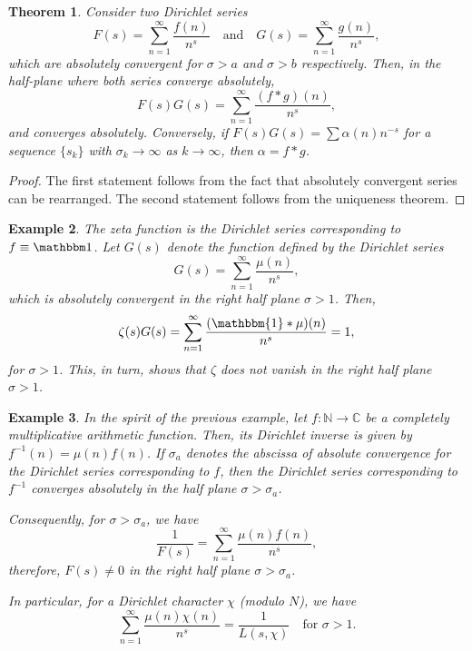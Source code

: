\documentclass[12pt]{article}
\theoremstyle{thmstyle}
\newtheorem{theorem}{Theorem}[section]
\theoremstyle{defstyle}
\newtheorem{example}[theorem]{Example}
\newcommand{\N}{\mathbb{N}}
\newcommand{\bbC}{\mathbb{C}}
\begin{document}
\begin{theorem}
    Consider two Dirichlet series 
    \begin{equation*}
        F(s) = \sum_{n = 1}^\infty\frac{f(n)}{n^s}\quad\text{and}\quad G(s) = \sum_{n = 1}^\infty\frac{g(n)}{n^s},
    \end{equation*}
    which are absolutely convergent for $\sigma > a$ and $\sigma > b$ respectively. Then, in the half-plane where both series converge absolutely, 
    \begin{equation*}
        F(s)G(s) = \sum_{n = 1}^\infty\frac{(f\ast g)(n)}{n^s},
    \end{equation*}
    and converges absolutely. Conversely, if $F(s)G(s) = \sum\alpha(n)n^{-s}$ for a sequence $\{s_k\}$ with $\sigma_k\to\infty$ as $k\to\infty$, then $\alpha = f\ast g$.
\end{theorem}
\begin{proof}
    The first statement follows from the fact that absolutely convergent series can be rearranged. The second statement follows from the uniqueness theorem.
\end{proof}

\begin{example}
    The zeta function is the Dirichlet series corresponding to $f\equiv\mathbbm 1$. Let $G(s)$ denote the function defined by the Dirichlet series 
    \begin{equation*}
        G(s) = \sum_{n = 1}^\infty\frac{\mu(n)}{n^s},
    \end{equation*}
    which is absolutely convergent in the right half plane $\sigma > 1$. Then, 
    \begin{equation*}
        \zeta(s)G(s) = \sum_{n = 1}^\infty\frac{(\mathbbm{1}\ast\mu)(n)}{n^s} = 1,
    \end{equation*}
    for $\sigma > 1$. This, in turn, shows that $\zeta$ does not vanish in the right half plane $\sigma > 1$.
\end{example}

\begin{example}
    In the spirit of the previous example, let $f: \N\to\bbC$ be a completely multiplicative arithmetic function. Then, its Dirichlet inverse is given by $f^{-1}(n) = \mu(n)f(n)$. If $\sigma_a$ denotes the abscissa of absolute convergence for the Dirichlet series corresponding to $f$, then the Dirichlet series corresponding to $f^{-1}$ converges absolutely in the half plane $\sigma > \sigma_a$. 

    Consequently, for $\sigma > \sigma_a$, we have 
    \begin{equation*}
        \frac{1}{F(s)} = \sum_{n = 1}^\infty\frac{\mu(n)f(n)}{n^s},
    \end{equation*}
    therefore, $F(s)\ne 0$ in the right half plane $\sigma > \sigma_a$. 

    In particular, for a Dirichlet character $\chi$ (modulo $N$), we have 
    \begin{equation*}
        \sum_{n = 1}^\infty \frac{\mu(n)\chi(n)}{n^s} = \frac{1}{L(s,\chi)}\quad\text{for }\sigma > 1.
    \end{equation*}
\end{example}
\end{document}
